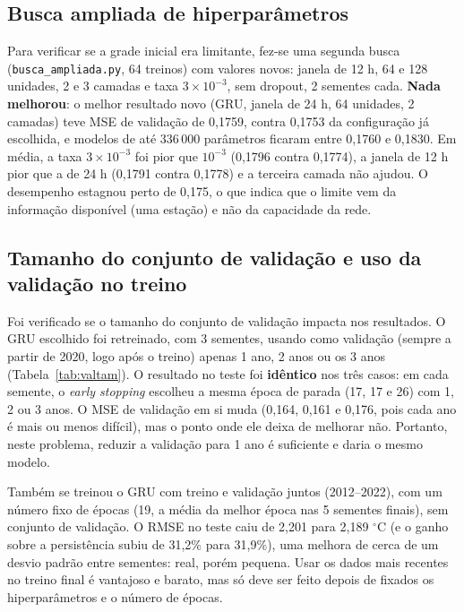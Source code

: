 \documentclass[11pt,a4paper]{article}
\begin{document}
\subsection{Busca ampliada de hiperparâmetros}\label{sec:ampliada}
Para verificar se a grade inicial era limitante, fez-se uma segunda busca (\texttt{busca\_ampliada.py}, 64 treinos) com valores novos: janela de 12 h, 64 e 128 unidades, 2 e 3 camadas e taxa $3\times10^{-3}$, sem dropout, 2 sementes cada. \textbf{Nada melhorou}: o melhor resultado novo (GRU, janela de 24 h, 64 unidades, 2 camadas) teve MSE de validação de 0,1759, contra 0,1753 da configuração já escolhida, e modelos de até 336\,000 parâmetros ficaram entre 0,1760 e 0,1830. Em média, a taxa $3\times10^{-3}$ foi pior que $10^{-3}$ (0,1796 contra 0,1774), a janela de 12 h pior que a de 24 h (0,1791 contra 0,1778) e a terceira camada não ajudou. O desempenho estagnou perto de 0,175, o que indica que o limite vem da informação disponível (uma estação) e não da capacidade da rede.

\subsection{Tamanho do conjunto de validação e uso da validação no treino}
Foi verificado se o tamanho do conjunto de validação impacta nos resultados. O GRU escolhido foi retreinado, com 3 sementes, usando como validação (sempre a partir de 2020, logo após o treino) apenas 1 ano, 2 anos ou os 3 anos (Tabela~\ref{tab:valtam}). O resultado no teste foi \textbf{idêntico} nos três casos: em cada semente, o \emph{early stopping} escolheu a mesma época de parada (17, 17 e 26) com 1, 2 ou 3 anos. O MSE de validação em si muda (0,164, 0,161 e 0,176, pois cada ano é mais ou menos difícil), mas o ponto onde ele deixa de melhorar não. Portanto, neste problema, reduzir a validação para 1 ano é suficiente e daria o mesmo modelo.

Também se treinou o GRU com treino e validação juntos (2012--2022), com um número fixo de épocas (19, a média da melhor época nas 5 sementes finais), sem conjunto de validação. O RMSE no teste caiu de 2,201 para 2,189 $^\circ$C (e o ganho sobre a persistência subiu de 31,2\% para 31,9\%), uma melhora de cerca de um desvio padrão entre sementes: real, porém pequena. Usar os dados mais recentes no treino final é vantajoso e barato, mas só deve ser feito depois de fixados os hiperparâmetros e o número de épocas.
\end{document}

